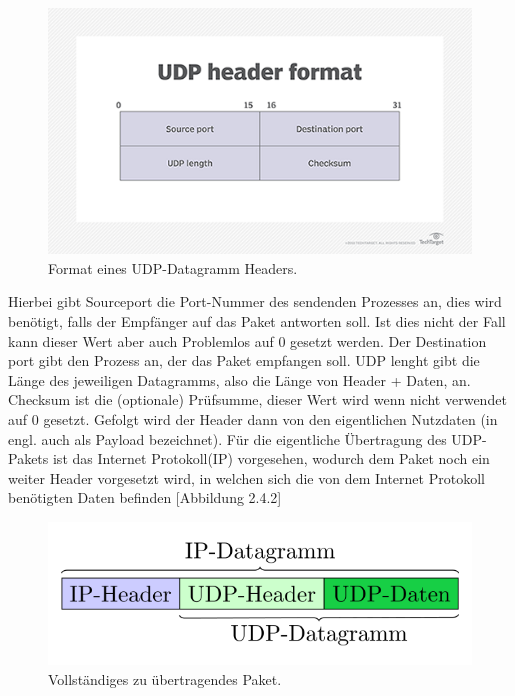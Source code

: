 \begin{figure}[H] \centering
\includegraphics[width=\textwidth]{Images/networking-udp_mobile.png} 
\vspace{-0.3cm} 
\caption{Format eines UDP-Datagramm Headers.}
\label{fig-elise} 
\end{figure}
Hierbei gibt Sourceport die Port-Nummer des sendenden Prozesses an, dies wird benötigt, falls der Empfänger auf das Paket antworten soll. Ist dies nicht der Fall kann dieser Wert aber auch Problemlos auf 0 gesetzt werden. Der Destination port gibt den Prozess an, der das Paket empfangen soll. UDP lenght gibt die Länge des jeweiligen Datagramms, also die Länge von Header + Daten, an. Checksum ist die (optionale) Prüfsumme, dieser Wert wird wenn nicht verwendet auf 0 gesetzt. Gefolgt wird der Header dann von den eigentlichen Nutzdaten (in engl. auch als Payload bezeichnet). Für die eigentliche Übertragung des UDP-Pakets ist das Internet Protokoll(IP) vorgesehen, wodurch dem Paket noch ein weiter Header vorgesetzt wird,  in welchen sich die von dem Internet Protokoll benötigten Daten befinden [Abbildung 2.4.2]

\begin{figure}[H] \centering
\includegraphics[width=\textwidth]{Images/Udp-package-scheme.png} 
\vspace{-0.3cm} 
\caption{Vollständiges zu übertragendes Paket.}
\label{fig-elise} 
\end{figure}